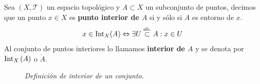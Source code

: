 \begin{defi}
Sea $(X,\mathcal{T})$ un espacio topológico y $A \subset X$ un subconjunto de puntos, decimos que un punto $x\in X$ es \textbf{punto interior de $A$} si y sólo si $A$ es entorno de $x$.
$$
x\in \operatorname{Int}_X(A) \Leftrightarrow \exists U \stackrel{\text{ab.}}{\subset} A : x \in U
$$
Al conjunto de puntos interiores lo llamamos \textbf{interior de $A$} y se denota por $\operatorname{Int}_X \left( A \right)$ o $\mathring{A}$.
\end{defi}

\begin{figure}[H]
    \centering
    \caption{\textit{Definición de interior de un conjunto.}}
    \label{fig:definición-interior}
\end{figure}

